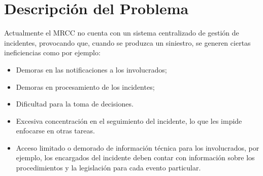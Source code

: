 \section{Descripción del Problema}\label{sec:descripcionDelProblema}

Actualmente el MRCC no cuenta con un sistema centralizado de gestión de incidentes, provocando que, cuando se produzca un siniestro, 
se generen ciertas ineficiencias como por ejemplo:

\begin{itemize}
    \item Demoras en las notificaciones a los involucrados;
    \item Demoras en procesamiento de los incidentes;
    \item Dificultad para la toma de decisiones.
    \item Excesiva concentración en el seguimiento del incidente, lo que les impide enfocarse en otras tareas.
    \item Acceso limitado o demorado de información técnica para los involucrados, por ejemplo, los encargados 
    del incidente deben contar con información sobre los procedimientos y la legislación para cada evento particular.
\end{itemize}

